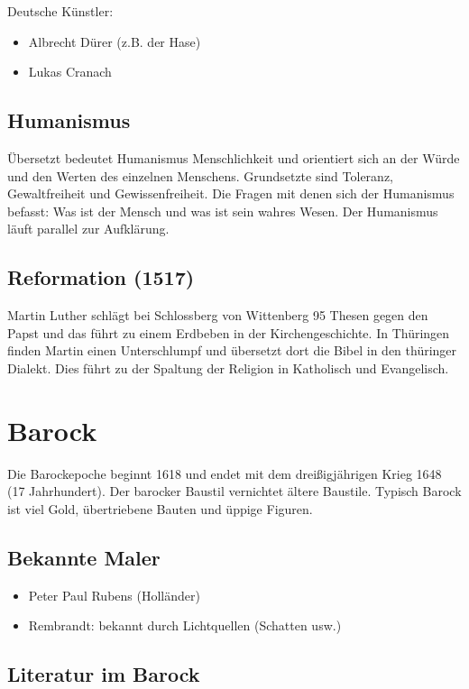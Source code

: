 \documentclass[12pt,a4paper]{article}
\begin{document}
Deutsche Künstler:

\begin{itemize}
\item Albrecht Dürer (z.B. der Hase)
\item Lukas Cranach
\end{itemize}

\subsection{Humanismus}
Übersetzt bedeutet Humanismus Menschlichkeit und orientiert sich an der Würde und den Werten des einzelnen Menschens. Grundsetzte sind Toleranz, Gewaltfreiheit und Gewissenfreiheit. Die Fragen mit denen sich der Humanismus befasst: Was ist der Mensch und was ist sein wahres Wesen. Der Humanismus läuft parallel zur Aufklärung.

\subsection{Reformation (1517)}
Martin Luther schlägt bei Schlossberg von Wittenberg 95 Thesen gegen den Papst und das führt zu einem Erdbeben in der Kirchengeschichte. In Thüringen finden Martin einen Unterschlumpf und übersetzt dort die Bibel in den thüringer Dialekt. Dies führt zu der Spaltung der Religion in Katholisch und Evangelisch.

\newpage

\section{Barock}
Die Barockepoche beginnt 1618 und endet mit dem dreißigjährigen Krieg 1648 (17 Jahrhundert). Der barocker Baustil vernichtet ältere Baustile. Typisch Barock ist viel Gold, übertriebene Bauten und üppige Figuren.


\subsection{Bekannte Maler}

\begin{itemize}
\item Peter Paul Rubens (Holländer)
\item Rembrandt: bekannt durch Lichtquellen (Schatten usw.)
\end{itemize}

\subsection{Literatur im Barock}
\end{document}
